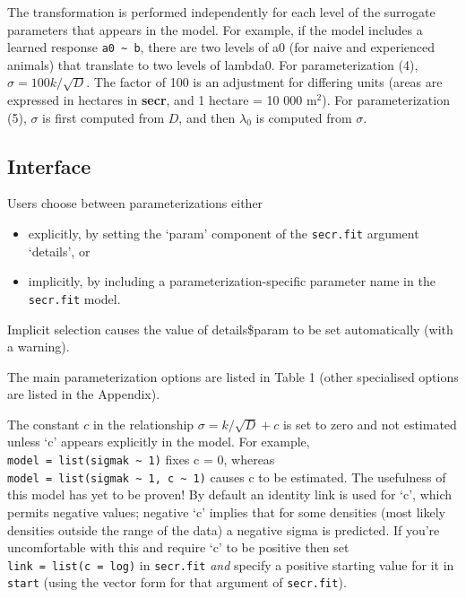 \documentclass[
]{book}
\providecommand{\tightlist}{%
  \setlength{\itemsep}{0pt}\setlength{\parskip}{0pt}}
\begin{document}
The transformation is performed independently for each level of the surrogate parameters that appears in the model. For example, if the model includes a learned response \texttt{a0\ \textasciitilde{}\ b}, there are two levels of a0 (for naive and experienced animals) that translate to two levels of lambda0. For parameterization (4), \(\sigma = 100 k / \sqrt D\). The factor of 100 is an adjustment for differing units (areas are expressed in hectares in \textbf{secr}, and 1 hectare = 10 000 \(\mbox{m}^2\)). For parameterization (5), \(\sigma\) is first computed from \(D\), and then \(\lambda_0\) is computed from \(\sigma\).

\subsection{Interface}\label{interface}

Users choose between parameterizations either

\begin{itemize}
\tightlist
\item
  explicitly, by setting the `param' component of the \texttt{secr.fit} argument `details', or
\item
  implicitly, by including a parameterization-specific parameter name in the \texttt{secr.fit} model.
\end{itemize}

Implicit selection causes the value of details\$param to be set automatically (with a warning).

The main parameterization options are listed in Table 1 (other specialised options are listed in the Appendix).

The constant \(c\) in the relationship \(\sigma = k / \sqrt{D} + c\) is set to zero and not estimated unless `c' appears explicitly in the model. For example, \texttt{model\ =\ list(sigmak\ \textasciitilde{}\ 1)} fixes c = 0, whereas \texttt{model\ =\ list(sigmak\ \textasciitilde{}\ 1,\ c\ \textasciitilde{}\ 1)} causes c to be estimated. The usefulness of this model has yet to be proven! By default an identity link is used for `c', which permits negative values; negative `c' implies that for some densities (most likely densities outside the range of the data) a negative sigma is predicted. If you're uncomfortable with this and require `c' to be positive then set \texttt{link\ =\ list(c\ =\ \textquotesingle{}log\textquotesingle{})} in \texttt{secr.fit} \emph{and} specify a positive starting value for it in \texttt{start} (using the vector form for that argument of \texttt{secr.fit}).
\end{document}
